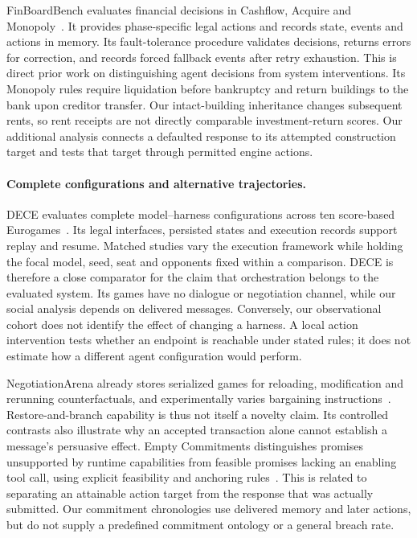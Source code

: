 FinBoardBench evaluates financial decisions in Cashflow, Acquire and Monopoly~\cite{hu2026finboardbench}. It provides phase-specific legal actions and records state, events and actions in memory. Its fault-tolerance procedure validates decisions, returns errors for correction, and records forced fallback events after retry exhaustion. This is direct prior work on distinguishing agent decisions from system interventions. Its Monopoly rules require liquidation before bankruptcy and return buildings to the bank upon creditor transfer. Our intact-building inheritance changes subsequent rents, so rent receipts are not directly comparable investment-return scores. Our additional analysis connects a defaulted response to its attempted construction target and tests that target through permitted engine actions.

\paragraph{Complete configurations and alternative trajectories.}
DECE evaluates complete model--harness configurations across ten score-based Eurogames~\cite{zhang2026dece}. Its legal interfaces, persisted states and execution records support replay and resume. Matched studies vary the execution framework while holding the focal model, seed, seat and opponents fixed within a comparison. DECE is therefore a close comparator for the claim that orchestration belongs to the evaluated system. Its games have no dialogue or negotiation channel, while our social analysis depends on delivered messages. Conversely, our observational cohort does not identify the effect of changing a harness. A local action intervention tests whether an endpoint is reachable under stated rules; it does not estimate how a different agent configuration would perform.

NegotiationArena already stores serialized games for reloading, modification and rerunning counterfactuals, and experimentally varies bargaining instructions~\cite{bianchi2024negotiationarena}. Restore-and-branch capability is thus not itself a novelty claim. Its controlled contrasts also illustrate why an accepted transaction alone cannot establish a message's persuasive effect. Empty Commitments distinguishes promises unsupported by runtime capabilities from feasible promises lacking an enabling tool call, using explicit feasibility and anchoring rules~\cite{empty_commitments_v2}. This is related to separating an attainable action target from the response that was actually submitted. Our commitment chronologies use delivered memory and later actions, but do not supply a predefined commitment ontology or a general breach rate.

